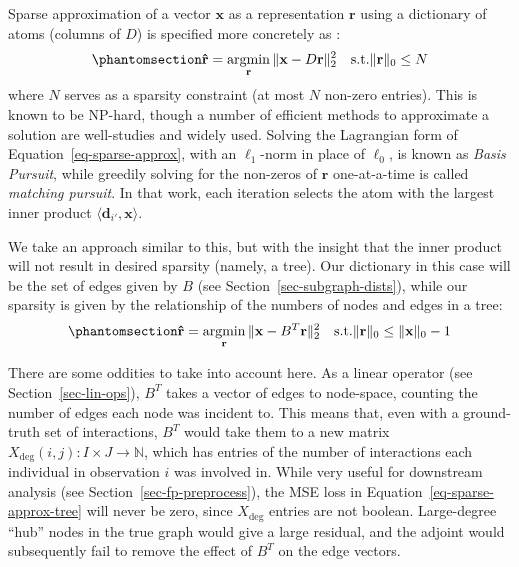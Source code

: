 \documentclass[%
	12pt,
		oneside,
		letterpaper
]{book}
\begin{document}
Sparse approximation of a vector \(\mathbf{x}\) as a representation
\(\mathbf{r}\) using a dictionary of atoms (columns of \(D\)) is
specified more concretely as
\autocite{EfficientimplementationK_Rubinstein2008}:
\begin{equation}\phantomsection\label{eq-sparse-approx}{\mathbf{\hat{r}} = \operatorname*{argmin}_{\mathbf{r}}{\|\mathbf{x}-D\mathbf{r} \|_2^2} \quad \text{s.t.} \|\mathbf{r}\|_0\leq N }\end{equation}
where \(N\) serves as a sparsity constraint (at most \(N\) non-zero
entries). This is known to be NP-hard, though a number of efficient
methods to approximate a solution are well-studies and widely used.
Solving the Lagrangian form of Equation~\ref{eq-sparse-approx}, with an
\(\ell_1\)-norm in place of \(\ell_0\), is known as \emph{Basis
Pursuit}\autocite{SparseApproximateSolutions_Natarajan1995}, while
greedily solving for the non-zeros of \(\mathbf{r}\) one-at-a-time is
called \emph{matching
pursuit}\autocite{Matchingpursuitstime_Mallat1993}. In that work, each
iteration selects the atom with the largest inner product
\(\langle \mathbf{d}_{i'},\mathbf{x}\rangle\).

We take an approach similar to this, but with the insight that the inner
product will not result in desired sparsity (namely, a tree). Our
dictionary in this case will be the set of edges given by \(B\) (see
Section~\ref{sec-subgraph-dists}), while our sparsity is given by the
relationship of the numbers of nodes and edges in a tree:
\begin{equation}\phantomsection\label{eq-sparse-approx-tree}{
\mathbf{\hat{r}} = \operatorname*{argmin}_{\mathbf{r}}{\|\mathbf{x}-B^T\mathbf{r} \|_2^2} \quad \text{s.t.} \|\mathbf{r}\|_0\leq \|\mathbf{x}\|_0 - 1
}\end{equation}

There are some oddities to take into account here. As a linear operator
(see Section~\ref{sec-lin-ops}), \(B^T\) takes a vector of edges to
node-space, counting the number of edges each node was incident to. This
means that, even with a ground-truth set of interactions, \(B^T\) would
take them to a new matrix
\(X_{\text{deg}}(i,j):I\times J \rightarrow \mathbb{N}\), which has
entries of the number of interactions each individual in observation
\(i\) was involved in. While very useful for downstream analysis (see
Section~\ref{sec-fp-preprocess}), the MSE loss in
Equation~\ref{eq-sparse-approx-tree} will never be zero, since
\(X_{\text{deg}}\) entries are not boolean. Large-degree ``hub'' nodes
in the true graph would give a large residual, and the adjoint would
subsequently fail to remove the effect of \(B^T\) on the edge vectors.
\end{document}
